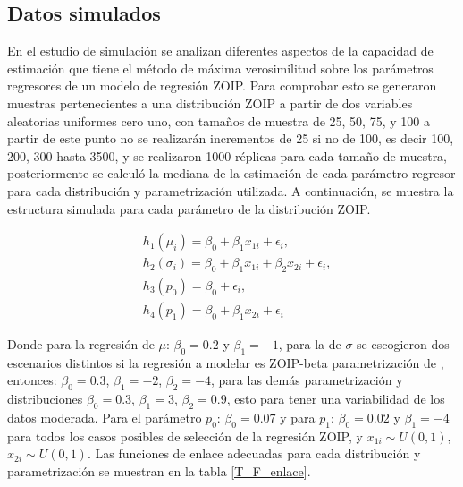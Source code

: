 \subsection{Datos simulados}
En el estudio de simulaci\'{o}n se analizan diferentes aspectos de la capacidad de estimaci\'{o}n que tiene el m\'{e}todo de m\'{a}xima verosimilitud sobre los par\'{a}metros regresores de un modelo de regresi\'{o}n ZOIP. Para comprobar esto se generaron muestras pertenecientes a una distribuci\'{o}n ZOIP a partir de dos variables aleatorias uniformes cero uno, con tama\~{n}os de muestra de 25, 50, 75, y 100 a partir de este punto no se realizar\'{a}n incrementos de 25 si no de 100, es decir 100, 200, 300 hasta 3500, y se realizaron 1000 r\'{e}plicas para cada tama\~{n}o de muestra, posteriormente se calcul\'{o} la mediana de la estimaci\'{o}n de cada par\'{a}metro regresor para cada distribuci\'{o}n y parametrizaci\'{o}n utilizada. A continuaci\'{o}n, se muestra la estructura simulada para cada par\'{a}metro de la distribuci\'{o}n ZOIP.

\begin{equation}
\begin{split}
&h_1(\mu_{i})=\beta_0+\beta_1x_{1i}+\epsilon_i,\\
&h_2(\sigma_{i})=\beta_0+\beta_1x_{1i}+\beta_2x_{2i}+\epsilon_i,\\
&h_3(p_0)=\beta_0+\epsilon_i,\\
&h_4(p_1) =\beta_0+\beta_1x_{2i}+\epsilon_i
\end{split}
\label{S_eq_reg}
\end{equation}

Donde para la regresi\'{o}n de $\mu$: $\beta_0=0.2$ y $\beta_1=-1$, para la de $\sigma$ se escogieron dos escenarios distintos si la regresi\'{o}n a modelar es ZOIP-beta parametrizaci\'{o}n de \cite{Stasinopoulos2}, entonces: $\beta_0=0.3$, $\beta_1=-2$, $\beta_2=-4$, para las dem\'{a}s parametrizaci\'{o}n y distribuciones $\beta_0=0.3$, $\beta_1=3$, $\beta_2=0.9$, esto para tener una variabilidad de los datos moderada. Para el par\'{a}metro $p_0$: $\beta_0=0.07$ y para $p_1$: $\beta_0=0.02$ y $\beta_1=-4$ para todos los casos posibles de selecci\'{o}n de la regresi\'{o}n ZOIP, y $x_{1i} \sim U(0,1)$, $x_{2i} \sim U(0,1)$. Las funciones de enlace adecuadas para cada distribuci\'{o}n y parametrizaci\'{o}n se muestran en la tabla \ref{T_F_enlace}.


